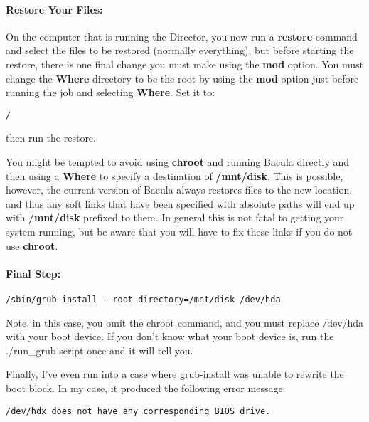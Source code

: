 \paragraph*{Restore Your Files:}

On the computer that is running the Director, you now run a {\bf restore}
command and select the files to be restored (normally everything), but before
starting the restore, there is one final change you must make using the {\bf
mod} option. You must change the {\bf Where} directory to be the root by using
the {\bf mod} option just before running the job and selecting {\bf Where}.
Set it to: 

\footnotesize
\begin{verbatim}
/
\end{verbatim}
\normalsize

then run the restore. 

You might be tempted to avoid using {\bf chroot} and running Bacula directly
and then using a {\bf Where} to specify a destination of {\bf /mnt/disk}. This
is possible, however, the current version of Bacula always restores files to
the new location, and thus any soft links that have been specified with
absolute paths will end up with {\bf /mnt/disk} prefixed to them. In general
this is not fatal to getting your system running, but be aware that you will
have to fix these links if you do not use {\bf chroot}. 

\paragraph*{Final Step:}



\footnotesize
\begin{verbatim}
/sbin/grub-install --root-directory=/mnt/disk /dev/hda
\end{verbatim}
\normalsize

Note, in this case, you omit the chroot command, and you must
replace /dev/hda with your boot device.  If you don't know what your
boot device is, run the ./run\_grub script once and it will tell
you.

Finally, I've even run into a case where grub-install was unable to
rewrite the boot block. In my case, it produced the following error
message:

\footnotesize
\begin{verbatim}
/dev/hdx does not have any corresponding BIOS drive.
\end{verbatim}
\normalsize

